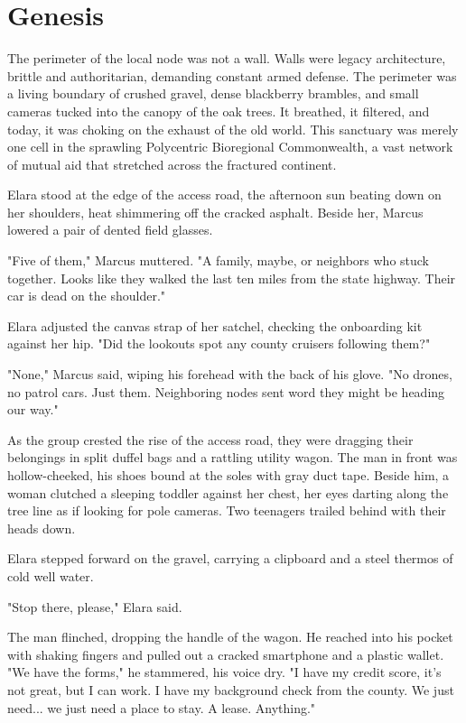 \chapter{Genesis}


The perimeter of the local node was not a wall. Walls were legacy architecture, brittle and authoritarian, demanding constant armed defense. The perimeter was a living boundary of crushed gravel, dense blackberry brambles, and small cameras tucked into the canopy of the oak trees. It breathed, it filtered, and today, it was choking on the exhaust of the old world. This sanctuary was merely one cell in the sprawling Polycentric Bioregional Commonwealth, a vast network of mutual aid that stretched across the fractured continent.

Elara stood at the edge of the access road, the afternoon sun beating down on her shoulders, heat shimmering off the cracked asphalt. Beside her, Marcus lowered a pair of dented field glasses.

"Five of them," Marcus muttered. "A family, maybe, or neighbors who stuck together. Looks like they walked the last ten miles from the state highway. Their car is dead on the shoulder."

Elara adjusted the canvas strap of her satchel, checking the onboarding kit against her hip. "Did the lookouts spot any county cruisers following them?"

"None," Marcus said, wiping his forehead with the back of his glove. "No drones, no patrol cars. Just them. Neighboring nodes sent word they might be heading our way."

As the group crested the rise of the access road, they were dragging their belongings in split duffel bags and a rattling utility wagon. The man in front was hollow-cheeked, his shoes bound at the soles with gray duct tape. Beside him, a woman clutched a sleeping toddler against her chest, her eyes darting along the tree line as if looking for pole cameras. Two teenagers trailed behind with their heads down.

Elara stepped forward on the gravel, carrying a clipboard and a steel thermos of cold well water.

"Stop there, please," Elara said.

The man flinched, dropping the handle of the wagon. He reached into his pocket with shaking fingers and pulled out a cracked smartphone and a plastic wallet. "We have the forms," he stammered, his voice dry. "I have my credit score, it's not great, but I can work. I have my background check from the county. We just need... we just need a place to stay. A lease. Anything."

